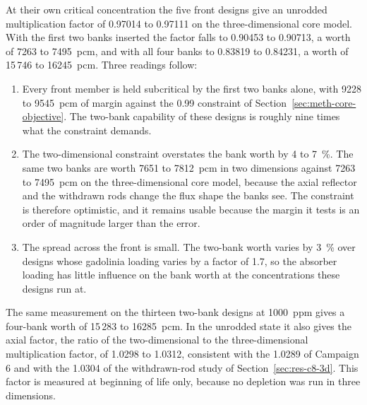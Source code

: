 At their own critical concentration the five front designs give an
unrodded multiplication factor of 0.97014 to 0.97111 on the three-dimensional core model.
With the first two banks inserted the factor falls to 0.90453 to 0.90713,
a worth of 7263 to \SI{7495}{pcm}, and with all four banks to 0.83819 to
0.84231, a worth of 15\,746 to \SI{16245}{pcm}. Three readings follow:

\begin{enumerate}
  \item Every front member is held subcritical by the first two banks alone,
        with 9228 to \SI{9545}{pcm} of margin against the 0.99 constraint of
        Section~\ref{sec:meth-core-objective}. The two-bank capability of
        these designs is roughly nine times what the constraint demands.

  \item The two-dimensional constraint overstates the bank worth by 4 to
        \SI{7}{\%}. The same two banks are worth 7651 to \SI{7812}{pcm} in
        two dimensions against 7263 to \SI{7495}{pcm} on the three-dimensional core model,
        because the axial reflector and the withdrawn rods change the flux shape
        the banks see. The constraint is therefore optimistic, and it remains
        usable because the margin it tests is an order of magnitude larger
        than the error.

  \item The spread across the front is small. The two-bank worth varies by
        \SI{3}{\%} over designs whose gadolinia loading varies by a factor of
        1.7, so the absorber loading has little influence on the bank worth
        at the concentrations these designs run at.
\end{enumerate}

The same measurement on the thirteen two-bank designs at \SI{1000}{ppm}
gives a four-bank worth of 15\,283 to \SI{16285}{pcm}. In the unrodded
state it also gives the axial factor, the ratio of the two-dimensional to
the three-dimensional multiplication factor, of 1.0298 to 1.0312,
consistent with the 1.0289 of Campaign 6 and with the 1.0304 of the
withdrawn-rod study of Section~\ref{sec:res-c8-3d}. This factor is measured at
beginning of life only, because no depletion was run in three dimensions.


